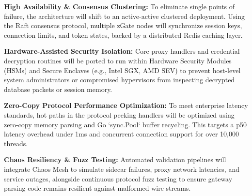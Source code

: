 \textbf{High Availability \& Consensus Clustering:}
To eliminate single points of failure, the architecture will shift to an active-active clustered deployment. Using the Raft consensus protocol, multiple zGate nodes will synchronize session keys, connection limits, and token states, backed by a distributed Redis caching layer.

\textbf{Hardware-Assisted Security Isolation:}
Core proxy handlers and credential decryption routines will be ported to run within Hardware Security Modules (HSMs) and Secure Enclaves (e.g., Intel SGX, AMD SEV) to prevent host-level system administrators or compromised hypervisors from inspecting decrypted database packets or session memory.

\textbf{Zero-Copy Protocol Performance Optimization:}
To meet enterprise latency standards, hot paths in the protocol peeking handlers will be optimized using zero-copy memory parsing and Go `sync.Pool` buffer recycling. This targets a p50 latency overhead under 1ms and concurrent connection support for over 10,000 threads.

\textbf{Chaos Resiliency \& Fuzz Testing:}
Automated validation pipelines will integrate Chaos Mesh to simulate sidecar failures, proxy network latencies, and service outages, alongside continuous protocol fuzz testing to ensure gateway parsing code remains resilient against malformed wire streams.